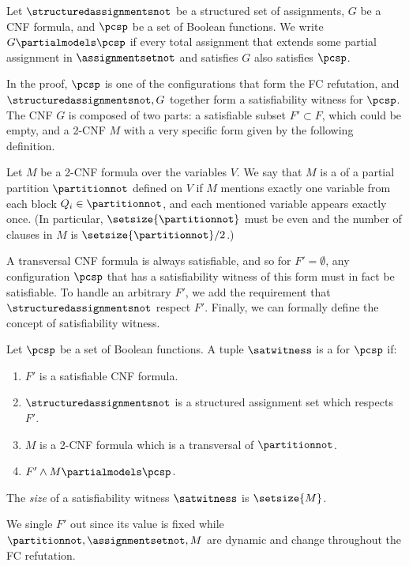 \begin{definition}
  \label{def:partialmodels}
  Let $\structuredassignmentsnot$ be a structured set of assignments, $G$ be a
  CNF formula, and $\pcsp$ be a set of Boolean functions.
  We write $G \partialmodels \pcsp$ if every total assignment that extends some partial assignment in $\assignmentsetnot$ and satisfies $G$ also satisfies $\pcsp$.
\end{definition}

In the proof, $\pcsp$ is one of the configurations that form the FC refutation, and $\structuredassignmentsnot,G$ together form a satisfiability witness for $\pcsp$. The CNF $G$ is composed of two parts: a satisfiable subset $F' \subset F$, which could be empty, and a 2-CNF $M$ with a very specific form given by the following definition.

\begin{definition}
  \label{def:transversal}
  Let $M$ be a 2-CNF formula over the variables $V$. We say that $M$ is a  of a partial partition $\partitionnot$ defined on $V$ if $M$ mentions exactly one variable from each block $Q_i \in \partitionnot$, and each mentioned variable appears exactly once. (In particular, $\setsize{\partitionnot}$ must be even and the number of clauses in $M$ is $\setsize{\partitionnot}/2$.)
\end{definition}

A transversal CNF formula is always satisfiable, and so for $F' = \emptyset$, any configuration $\pcsp$ that has a satisfiability witness of this form must in fact be satisfiable. To handle an arbitrary $F'$, we add the requirement that $\structuredassignmentsnot$ respect $F'$. Finally, we can formally define the concept of satisfiability witness.
%

\begin{definition}
 \label{def:witness}
 Let $\pcsp$ be a set of Boolean functions. A tuple $\satwitness$ is a  for $\pcsp$ if:
\begin{enumerate}
 \item $F'$ is a satisfiable CNF formula.
 \item $\structuredassignmentsnot$ is a structured assignment set which respects $F'$.
 \item $M$ is a 2-CNF formula which is a transversal of $\partitionnot$.
 \item $F'\land M \partialmodels \pcsp$.
\end{enumerate}
 The \emph{size} of a satisfiability witness $\satwitness$ is $\setsize{M}$.
\end{definition}
We single $F'$ out since its value is fixed while $\partitionnot,\assignmentsetnot,M$ are dynamic and change throughout the FC refutation.

